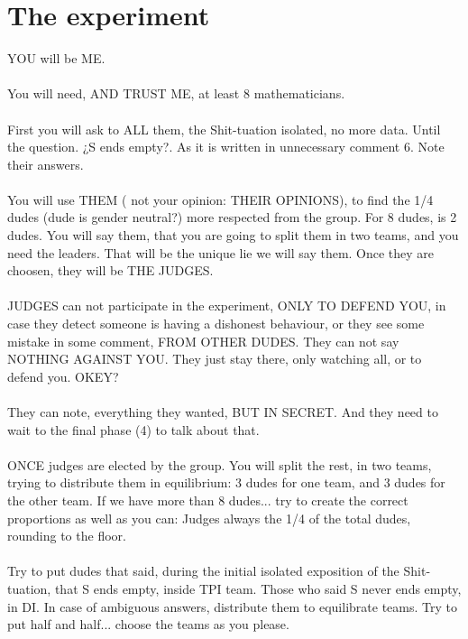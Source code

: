 		
	\section{The experiment}
	
		\noindent
		YOU will be ME.
		\\\\
		
		\noindent
		You will need, AND TRUST ME, at least 8 mathematicians.
		\\\\
		
		\noindent
		First you will ask to ALL them, the Shit-tuation isolated, no more data. Until the question. ¿S ends empty?. As it is written in unnecessary comment 6. Note their answers.
		\\\\
		
		\noindent
		You will use THEM ( not your opinion: THEIR OPINIONS), to find the 1/4 dudes (dude is gender neutral?) more respected from the group. For 8 dudes, is 2 dudes. You will say them, that you are going to split them in two teams, and you need the leaders. That will be the unique lie we will say them. Once they are choosen, they will be THE JUDGES.
		\\\\
		
		\noindent
		JUDGES can not participate in the experiment, ONLY TO DEFEND YOU, in case they detect someone is having a dishonest behaviour, or they see some mistake in some comment, FROM OTHER DUDES. They can not say NOTHING AGAINST YOU. They just stay there, only watching all, or to defend you. OKEY?
		\\\\
		
		\noindent
		They can note, everything they wanted, BUT IN SECRET. And they need to wait to the final phase (4) to talk about that.
		\\\\
		
		\noindent
		ONCE judges are elected by the group. You will split the rest, in two teams, trying to distribute them in equilibrium: 3 dudes for one team, and 3 dudes for the other team. If we have more than 8 dudes... try to create the correct proportions as well as you can: Judges always the 1/4 of the total dudes, rounding to the floor.
		\\\\
		
		\noindent
		Try to put dudes that said, during the initial isolated exposition of the Shit-tuation, that S ends empty, inside TPI team. Those who said S never ends empty, in DI. In case of ambiguous answers, distribute them to equilibrate teams. Try to put half and half... choose the teams as you please.
		\\\\
		
